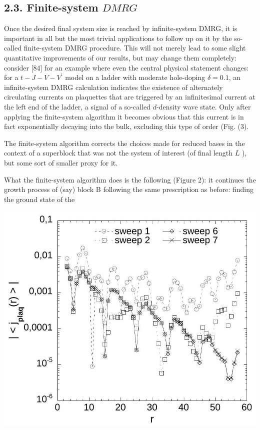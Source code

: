 \documentclass[12pt]{article}
\begin{document}
\subsection*{2.3. Finite-system $D M R G$}
Once the desired final system size is reached by infinite-system DMRG, it is important in all but the most trivial applications to follow up on it by the so-called finite-system DMRG procedure. This will not merely lead to some slight quantitative improvements of our results, but may change them completely: consider [84] for an example where even the central physical statement changes: for a $t-J-V-V^{\prime}$ model on a ladder with moderate hole-doping $\delta=0.1$, an infinite-system DMRG calculation indicates the existence of alternately circulating currents on plaquettes that are triggered by an infinitesimal current at the left end of the ladder, a signal of a so-called $d$-density wave state. Only after applying the finite-system algorithm it becomes obvious that this current is in fact exponentially decaying into the bulk, excluding this type of order (Fig. (3).

The finite-system algorithm corrects the choices made for reduced bases in the context of a superblock that was not the system of interest (of final length $L$ ), but some sort of smaller proxy for it.

What the finite-system algorithm does is the following (Figure 2): it continues the growth process of (say) block B following the same prescription as before: finding the ground state of the

\begin{center}
\includegraphics[max width=\textwidth]{2024_05_04_afc4ad226da9ccfe0ac8g-012}
\end{center}
\end{document}
